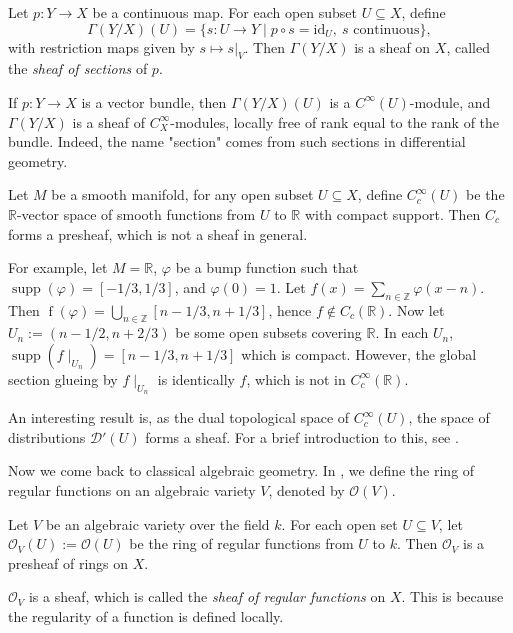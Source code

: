 \documentclass[11pt]{article}
\begin{document}
\begin{example}
Let \(p:Y\to X\) be a continuous map. For each open subset \(U\subseteq X\),
define
\[
\Gamma(Y/X)(U)=\{s:U\to Y \mid p\circ s=\mathrm{id}_U,\ s\text{ continuous}\},
\]
with restriction maps given by \(s\mapsto s|_V\). Then \(\Gamma(Y/X)\) is a
sheaf on \(X\), called the \emph{sheaf of sections} of \(p\). 

If \(p: Y \to X\) is a vector bundle, then \(\Gamma(Y/X)(U)\) is a
\(C^\infty(U)\)-module, and \(\Gamma(Y/X)\) is a sheaf of
\(C^\infty_X\)-modules, locally free of rank equal to the rank of the bundle.
Indeed, the name "section" comes from such sections 
in differential geometry. 
    
\end{example}


\begin{example}
    Let $ M $ be a smooth manifold, for any open subset $ U \subseteq X $, 
    define $ C_{c}^{\infty}(U) $ be the $ \mathbb{R} $-vector space of 
    smooth functions from $ U $ to $ \mathbb{R} $ with compact support. 
    Then $ C_{c} $ forms a presheaf, which is not a sheaf in general. 

    For example, let $ M= \mathbb{R} $, 
    $ \varphi $ be a bump function such that 
    $ \operatorname{supp}(\varphi) = [-1/3,1/3]$, and 
    $ \varphi(0)=1 $. Let 
    $ f(x)= \sum_{n \in \mathbb{Z}} \varphi(x-n) $. 
    Then $ \operatorname{f}(\varphi) = \bigcup_{n \in \mathbb{Z}} [n-1/3,n+1/3] $, 
    hence $ f \notin C_{c}(\mathbb{R}) $. 
    Now let $ U_{n}:=(n-1/2,n+2/3) $ be some open subsets covering $ \mathbb{R} $. 
    In each $ U_{n} $, 
    $\operatorname{supp}(f \mid_{U_{n}})=[n-1/3,n+1/3]$ which is compact. 
    However, the global section glueing by $ f\mid_{U_{n}} $ 
    is identically $ f $, which is not in $ C_{c}^{\infty}(\mathbb{R})$. 

    An interesting result is, as the dual topological space of 
    $ C_{c}^{\infty}(U) $, the space of distributions 
    $ \mathcal{D}'(U) $ forms a sheaf. 
    For a brief introduction to this, see \cite[{4.5}]{wikiDistribution}.
\end{example}

Now we come back to classical algebraic geometry. 
In \cite[I.3 Morphisms]{hartsAG}, we define the ring of regular functions on 
an algebraic variety $ V $, denoted by $ \mathscr{O}(V) $. 

\begin{example}
    \cite[Example II.1.0.1]{hartsAG} 
    Let $ V $ be an algebraic variety over the field $ k $. 
    For each open set $ U \subseteq V $, let 
    $ \mathscr{O}_{V}(U):=\mathscr{O}(U) $ be the ring of regular 
    functions from $ U $ to $ k $. Then $ \mathscr{O}_{V} $ 
    is a presheaf of rings on $ X $. 
    
    $ \mathscr{O}_{V} $ is a sheaf, which is called 
    the \emph{sheaf of regular functions} on $ X $. 
    This is because the regularity of a function is defined locally. 
\end{example}
\end{document}
